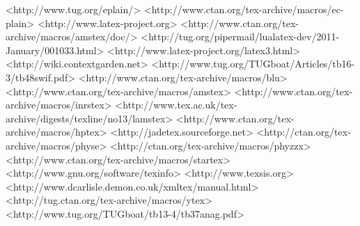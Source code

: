 	<http://www.tug.org/eplain/>
	<http://www.ctan.org/tex-archive/macros/ec-plain>
	<http://www.latex-project.org>
	<http://www.ctan.org/tex-archive/macros/amstex/doc/>
	<http://tug.org/pipermail/lualatex-dev/2011-January/001033.html>
	<http://www.latex-project.org/latex3.html>
	<http://wiki.contextgarden.net>
	<http://www.tug.org/TUGboat/Articles/tb16-3/tb48swif.pdf>
	<http://www.ctan.org/tex-archive/macros/blu>
	<http://www.ctan.org/tex-archive/macros/amstex>
	<http://www.ctan.org/tex-archive/macros/inrstex>
	<http://www.tex.ac.uk/tex-archive/digests/texline/no13/lamstex>
	<http://www.ctan.org/tex-archive/macros/hptex>
	<http://jadetex.sourceforge.net>
	<http://ctan.org/tex-archive/macros/physe>
	<http://ctan.org/tex-archive/macros/phyzzx>
	<http://www.ctan.org/tex-archive/macros/startex>
	<http://www.gnu.org/software/texinfo>
	<http://www.texsis.org>
	<http://www.dcarlisle.demon.co.uk/xmltex/manual.html>
	<http://tug.ctan.org/tex-archive/macros/ytex>
	<http://www.tug.org/TUGboat/tb13-4/tb37anag.pdf>

